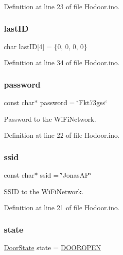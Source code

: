 Definition at line 23 of file Hodoor.\+ino.

\mbox{\label{_hodoor_8ino_a1e3c969869954f5a43ca5bb4a7209ad9}} 
\subsubsection{\texorpdfstring{last\+ID}{lastID}}
{\footnotesize\ttfamily char last\+ID\mbox{[}4\mbox{]} = \{0, 0, 0, 0\}}



Definition at line 34 of file Hodoor.\+ino.

\mbox{\label{_hodoor_8ino_aa4a2ebcb494493f648ae1e6975672575}} 
\subsubsection{\texorpdfstring{password}{password}}
{\footnotesize\ttfamily const char$\ast$ password = \char`\"{}Fkt73gss\char`\"{}}



Password to the Wi\+Fi\+Network. 



Definition at line 22 of file Hodoor.\+ino.

\mbox{\label{_hodoor_8ino_a587ba0cb07f02913598610049a3bbb79}} 
\subsubsection{\texorpdfstring{ssid}{ssid}}
{\footnotesize\ttfamily const char$\ast$ ssid = \char`\"{}Jonas\+AP\char`\"{}}



S\+S\+ID to the Wi\+Fi\+Network. 



Definition at line 21 of file Hodoor.\+ino.

\mbox{\label{_hodoor_8ino_a8159095f9d2ebca4cde1f98efbda59bf}} 
\subsubsection{\texorpdfstring{state}{state}}
{\footnotesize\ttfamily \mbox{\hyperlink{_hodoor_8ino_a117f8df7c03b73093e6da94ae41b4252}{Door\+State}} state = \mbox{\hyperlink{_hodoor_8ino_a117f8df7c03b73093e6da94ae41b4252a18cd602003cbe103c9e4c31b1457bb36}{D\+O\+O\+R\+O\+P\+EN}}}



